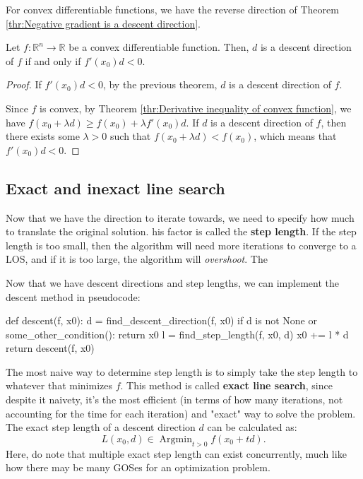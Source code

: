For convex differentiable functions, we have the reverse direction of Theorem
\ref{thr:Negative gradient is a descent direction}.

\begin{theorem}
\label{thr:Descent direction of convex differentiable function}
  Let \( f: \mathbb{R}^{n} \to \mathbb{R}\) be a convex differentiable function.
  Then, \( d \) is a descent direction of \( f \) if and only if \( f'(x_{0})d <
  0\).
\end{theorem}

\begin{proof}
  If \( f'(x_{0})d < 0 \), by the previous theorem, \( d \) is a descent
  direction of \( f \).

  Since \( f \) is convex, by Theorem \ref{thr:Derivative inequality of convex
  function}, we have \( f(x_{0} + \lambda d) \ge f(x_{0}) + \lambda f'(x_{0})d
  \). If \( d \) is a descent direction of \( f \), then there exists some \(
  \lambda > 0 \) such that \( f(x_{0} + \lambda d) < f(x_{0}) \), which means
  that \( f'(x_{0})d < 0 \).
\end{proof}


\subsection{Exact and inexact line search} %
\label{sub:Exact and inexact Line search}

Now that we have the direction to iterate towards, we need to specify how much
to translate the original solution.
his factor is called the \textbf{step length}. If the step length is too small, then
the algorithm will need more iterations to converge to a LOS, and if it is too
large, the algorithm will \textit{overshoot}. The 

Now that we have descent directions and step lengths, we can implement the
descent method in pseudocode:
\begin{python}
def descent(f, x0):
  d = find_descent_direction(f, x0)
  if d is not None or some_other_condition():
    return x0
  l = find_step_length(f, x0, d)
  x0 += l * d
  return descent(f, x0)
\end{python}

The most naive way to determine step length is to simply take the step length to
whatever that minimizes \( f \). This method is called \textbf{exact line
search}, since despite it naivety, it's the most efficient (in terms of how many
iterations, not accounting for the time for each iteration) and "exact" way to
solve the problem. The exact step length of a descent direction \( d \) can be
calculated as:
\[
  L(x_{0}, d) \in \operatorname{Argmin}_{t > 0} f(x_{0} + t d)
.\] Here, do note that multiple exact step length can exist concurrently, much
like how there may be many GOSes for an optimization problem.


